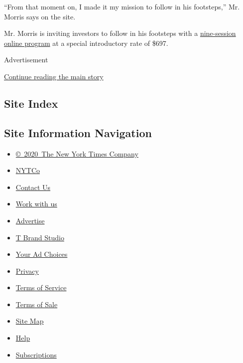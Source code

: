 ``From that moment on, I made it my mission to follow in his
footsteps,'' Mr. Morris says on the site.

Mr. Morris is inviting investors to follow in his footsteps with a
\href{https://financialfreedomacademy.com}{nine-session online program}
at a special introductory rate of \$697.

Advertisement

\protect\hyperlink{after-bottom}{Continue reading the main story}

\hypertarget{site-index}{%
\subsection{Site Index}\label{site-index}}

\hypertarget{site-information-navigation}{%
\subsection{Site Information
Navigation}\label{site-information-navigation}}

\begin{itemize}
\tightlist
\item
  \href{https://help.nytimes.com/hc/en-us/articles/115014792127-Copyright-notice}{©~2020~The
  New York Times Company}
\end{itemize}

\begin{itemize}
\tightlist
\item
  \href{https://www.nytco.com/}{NYTCo}
\item
  \href{https://help.nytimes.com/hc/en-us/articles/115015385887-Contact-Us}{Contact
  Us}
\item
  \href{https://www.nytco.com/careers/}{Work with us}
\item
  \href{https://nytmediakit.com/}{Advertise}
\item
  \href{http://www.tbrandstudio.com/}{T Brand Studio}
\item
  \href{https://www.nytimes.com/privacy/cookie-policy\#how-do-i-manage-trackers}{Your
  Ad Choices}
\item
  \href{https://www.nytimes.com/privacy}{Privacy}
\item
  \href{https://help.nytimes.com/hc/en-us/articles/115014893428-Terms-of-service}{Terms
  of Service}
\item
  \href{https://help.nytimes.com/hc/en-us/articles/115014893968-Terms-of-sale}{Terms
  of Sale}
\item
  \href{https://spiderbites.nytimes.com}{Site Map}
\item
  \href{https://help.nytimes.com/hc/en-us}{Help}
\item
  \href{https://www.nytimes.com/subscription?campaignId=37WXW}{Subscriptions}
\end{itemize}
